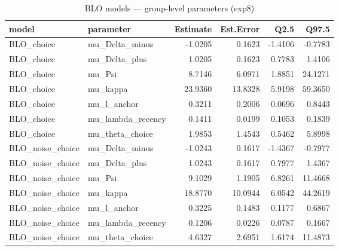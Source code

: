 \begin{table}

\caption{BLO models — group-level parameters (exp8)}
\centering
\begin{tabular}[t]{llrrrr}
\toprule
model & parameter & Estimate & Est.Error & Q2.5 & Q97.5\\
\midrule
BLO\_choice & mu\_Delta\_minus & -1.0205 & 0.1623 & -1.4106 & -0.7783\\
BLO\_choice & mu\_Delta\_plus & 1.0205 & 0.1623 & 0.7783 & 1.4106\\
BLO\_choice & mu\_Psi & 8.7146 & 6.0971 & 1.8851 & 24.1271\\
BLO\_choice & mu\_kappa & 23.9360 & 13.8328 & 5.9198 & 59.3650\\
BLO\_choice & mu\_l\_anchor & 0.3211 & 0.2006 & 0.0696 & 0.8443\\
\addlinespace
BLO\_choice & mu\_lambda\_recency & 0.1411 & 0.0199 & 0.1053 & 0.1839\\
BLO\_choice & mu\_theta\_choice & 1.9853 & 1.4543 & 0.5462 & 5.8998\\
BLO\_noise\_choice & mu\_Delta\_minus & -1.0243 & 0.1617 & -1.4367 & -0.7977\\
BLO\_noise\_choice & mu\_Delta\_plus & 1.0243 & 0.1617 & 0.7977 & 1.4367\\
BLO\_noise\_choice & mu\_Psi & 9.1029 & 1.1905 & 6.8261 & 11.4668\\
\addlinespace
BLO\_noise\_choice & mu\_kappa & 18.8770 & 10.0944 & 6.0542 & 44.2619\\
BLO\_noise\_choice & mu\_l\_anchor & 0.3225 & 0.1483 & 0.1177 & 0.6867\\
BLO\_noise\_choice & mu\_lambda\_recency & 0.1206 & 0.0226 & 0.0787 & 0.1667\\
BLO\_noise\_choice & mu\_theta\_choice & 4.6327 & 2.6951 & 1.6174 & 11.4873\\
\bottomrule
\end{tabular}
\end{table}
